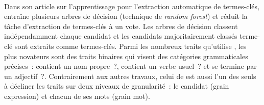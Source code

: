         ~\\Dans son article sur l'apprentissage pour l'extraction automatique de
        termes-clés,  entraîne plusieurs
        arbres de décision (technique de \textit{random forest}) et réduit la
        tâche d'extraction de termes-clés à un vote. Les arbres de décision
        classent indépendamment chaque candidat et les candidats majoritairement
        classés \og{}terme-clé\fg{} sont extraits comme termes-clés. Parmi les
        nombreux traits qu'utilise , les
        plus novateurs sont des traits binaires qui visent des catégories
        grammaticales précises~: \og{}contient un nom propre~?\fg{},
        \og{}contient un verbe usuel~?\fg{} et \og{}se termine par un
        adjectif~?\fg{}. Contrairement aux autres travaux, celui de
         est aussi l'un des seuls à
        décliner les traits sur deux niveaux de granularité~: le candidat (grain
        expression) et chacun de ses mots (grain mot).


